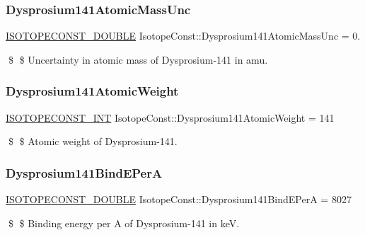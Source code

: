 \subsubsection{\texorpdfstring{Dysprosium141\+Atomic\+Mass\+Unc}{Dysprosium141AtomicMassUnc}}
{\footnotesize\ttfamily \mbox{\hyperlink{group___isotope_const-_macros_ga8f45a7272ce02c0b4c65c44636ed719a}{I\+S\+O\+T\+O\+P\+E\+C\+O\+N\+S\+T\+\_\+\+D\+O\+U\+B\+LE}} Isotope\+Const\+::\+Dysprosium141\+Atomic\+Mass\+Unc = 0.}

\$ \$ Uncertainty in atomic mass of Dysprosium-\/141 in amu. \mbox{\label{group___isotope_const-_dysprosium-_dy141_gaf72eed9f0d039a6bdf6a93d67e5b816a}} 
\subsubsection{\texorpdfstring{Dysprosium141\+Atomic\+Weight}{Dysprosium141AtomicWeight}}
{\footnotesize\ttfamily \mbox{\hyperlink{group___isotope_const-_macros_ga5f18360b3e99483a35c32d789e62621c}{I\+S\+O\+T\+O\+P\+E\+C\+O\+N\+S\+T\+\_\+\+I\+NT}} Isotope\+Const\+::\+Dysprosium141\+Atomic\+Weight = 141}

\$ \$ Atomic weight of Dysprosium-\/141. \mbox{\label{group___isotope_const-_dysprosium-_dy141_ga6d0f62a4769dd3881b33a51586f1d81f}} 
\subsubsection{\texorpdfstring{Dysprosium141\+Bind\+E\+PerA}{Dysprosium141BindEPerA}}
{\footnotesize\ttfamily \mbox{\hyperlink{group___isotope_const-_macros_ga8f45a7272ce02c0b4c65c44636ed719a}{I\+S\+O\+T\+O\+P\+E\+C\+O\+N\+S\+T\+\_\+\+D\+O\+U\+B\+LE}} Isotope\+Const\+::\+Dysprosium141\+Bind\+E\+PerA = 8027}

\$ \$ Binding energy per A of Dysprosium-\/141 in keV. \mbox{\label{group___isotope_const-_dysprosium-_dy141_ga3e916cec9de10a0375128122ea08b862}} 
